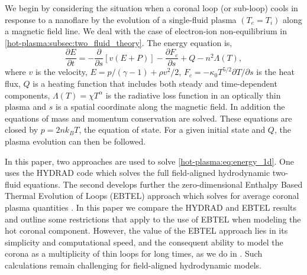 We begin by considering the situation when a coronal loop (or sub-loop) cools in response to a nanoflare by the evolution of a single-fluid plasma $(T_e = T_i)$ along a magnetic field line. We deal with the case of electron-ion non-equilibrium in  \autoref{hot-plasma:subsec:two_fluid_theory}. The energy equation is,
\begin{equation}\label{hot-plasma:eq:energy_1d}
    \frac{\partial E}{\partial t} = -\frac{\partial}{\partial s}[v(E+P)] - \frac{\partial F_c}{\partial s} + Q - n^2\Lambda(T),
\end{equation}
where $v$ is the velocity, $E=p/(\gamma -1) + \rho v^2/2$, $F_c=-\kappa_0 T^{5/2}\partial T/\partial s$ is the heat flux, $Q$ is a heating function that includes both steady and time-dependent components, $\Lambda(T)=\chi T^{\alpha}$ is the radiative loss function in an optically thin plasma \citep[e.g.][]{klimchuk_highly_2008} and $s$ is a spatial coordinate along the magnetic field. In addition the equations of mass and momentum conservation are solved. These equations are closed by $p=2nk_BT$, the equation of state. For a given initial state and $Q$, the plasma evolution can then be followed.

In this paper, two approaches are used to solve \autoref{hot-plasma:eq:energy_1d}. One uses the HYDRAD code \citep{bradshaw_influence_2013} which solves the full field-aligned hydrodynamic two-fluid equations. The second develops further the zero-dimensional Enthalpy Based Thermal Evolution of Loops (EBTEL) approach which solves for average coronal plasma quantities \citep{klimchuk_highly_2008,cargill_enthalpy-based_2012,cargill_enthalpy-based_2012-1,cargill_modelling_2015}. In this paper we compare the HYDRAD and EBTEL results and outline some restrictions that apply to the use of EBTEL when modeling the hot coronal component. However, the value of the EBTEL approach lies in its simplicity and computational speed, and the consequent ability to model the corona as a multiplicity of thin loops for long times, as we do in . Such calculations remain challenging for field-aligned hydrodynamic models.

